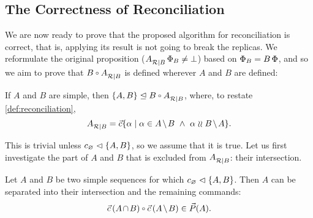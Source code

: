 
\subsection{The Correctness of Reconciliation}

We are now ready to prove that the proposed algorithm for reconciliation is correct,
that is, applying its result is not going to break the replicas.
We reformulate the original proposition (${A}^{}_{\mathcal{R}|{B}}\,\Phi_B\neq\bot$)
based on $\Phi_B=B\,\Phi$, and so we aim to prove that
$B\cc\reca$ is defined wherever $A$ and $B$ are defined:

\begin{myth}
If $A$ and $B$ are simple, then $\worksmbx{A,B}{B\cc \reca}$,
where, to restate \cref{def:reconciliation},
\[ \reca = \ords{\alpha \whr \alpha\in \ambnp  \ \wedge\   \alpha\indep \bmanp }. \]
\end{myth}

This is trivial unless ${c_\varnothing}\vartriangleleft{\{{A,B}\}}$, so we assume that it is true.
Let us first investigate the part of $A$ and $B$ that is excluded from
${A}^{}_{\mathcal{R}|{B}}$: their intersection.

\begin{mylem}
Let $A$ and $B$ be two simple sequences for which ${c_\varnothing}\vartriangleleft{\{{A, B}\}}$.
Then $A$ can be separated into their intersection and the remaining commands:
\[ \acb\cc\amb \in \orderset{A}. \]
\end{mylem}

